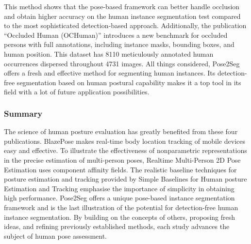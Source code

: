 \documentclass[runningheads]{llncs}
\begin{document}
        This method shows that the pose-based framework can better handle occlusion and obtain higher accuracy on the human instance segmentation test compared to the most sophisticated detection-based approach. Additionally, the publication ``Occluded Human (OCHuman)'' introduces a new benchmark for occluded persons with full annotations, including instance masks, bounding boxes, and human position. This dataset has 8110 meticulously annotated human occurrences dispersed throughout 4731 images. All things considered, Pose2Seg offers a fresh and effective method for segmenting human instances. Its detection-free segmentation based on human postural capability makes it a top tool in its field with a lot of future application possibilities. 
    \subsubsection{Summary}
        The science of human posture evaluation has greatly benefited from these four publications. BlazePose makes real-time body location tracking of mobile devices easy and effective. To illustrate the effectiveness of nonparametric representations in the precise estimation of multi-person poses, Realtime Multi-Person 2D Pose Estimation uses component affinity fields. The realistic baseline techniques for posture estimation and tracking provided by Simple Baselines for Human posture Estimation and Tracking emphasise the importance of simplicity in obtaining high performance. Pose2Seg offers a unique pose-based instance segmentation framework and is the last illustration of the potential for detection-free human instance segmentation. By building on the concepts of others, proposing fresh ideas, and refining previously established methods, each study advances the subject of human pose assessment.
\end{document}

